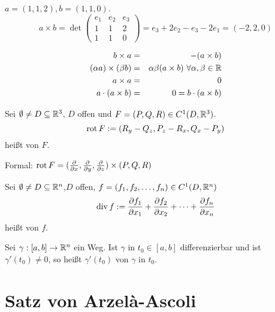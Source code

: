 \documentclass[a4paper,twoside,DIV15,BCOR12mm]{scrbook}
\begin{document}
\begin{beispiel}
$a = (1,1,2), b=(1,1,0)$. 
\[ a \times b  = \det \begin{pmatrix} e_1 & e_2 & e_3 \\ 1 & 1 & 2 \\ 1 & 1 & 0 \end{pmatrix} = e_3 + 2e_2 - e_3 -2e_1 = (-2,2,0) \]
\end{beispiel}

\begin{bemerkung}[Regeln]
\begin{eqnarray*}
b\times a &=& - (a\times b) \\
(\alpha a) \times (\beta b) &=& \alpha\beta (a\times b) \ \forall \alpha, \beta \in\MdR \\
a \times a &=& 0 \\
a \cdot (a\times b) &= & 0 = b \cdot (a\times b)
\end{eqnarray*}
\end{bemerkung}

\begin{definition}
Sei $\emptyset \ne D \subseteq \mathbb{R}^3$, $D$ offen und $F=(P,Q,R)\in C^1(D,\mathbb{R}^3)$.
\[ \mathop{\rm rot}\nolimits F := (R_y - Q_z , P_z - R_x, Q_x-P_y) \]
heißt  von $F$.

Formal: $\mathop{\rm rot}\nolimits F = (\frac\partial{\partial x}, \frac\partial{\partial y}, \frac\partial{\partial z})\times(P,Q,R) $
\end{definition}

\begin{definition}
Sei $\emptyset \ne D \subseteq \mathbb{R}^n$,$D$ offen, $f=(f_1,f_2,\ldots,f_n)\in C^1(D,\mathbb{R}^n)$
\[ \mathop{\rm div}\nolimits f := \frac{\partial f_1}{\partial x_1} + \frac{\partial f_2}{\partial x_2} + \cdots + \frac{\partial f_n}{\partial x_n} \]
heißt  von $f$.
\end{definition}

\begin{definition}
Sei $\gamma : [a,b] \to \mathbb{R}^n$ ein Weg. Ist $\gamma$ in $t_0\in[a,b]$ differenzierbar und ist $\gamma'(t_0) \ne 0$, so heißt $\gamma'(t_0)$  von $\gamma$ in $t_0$.
\end{definition}


\renewcommand{\thechapter}{\arabic{chapter}}
\renewcommand{\chaptername}{§}
\setcounter{chapter}{0}
\chapter{Satz von Arzelà-Ascoli}
\end{document}

